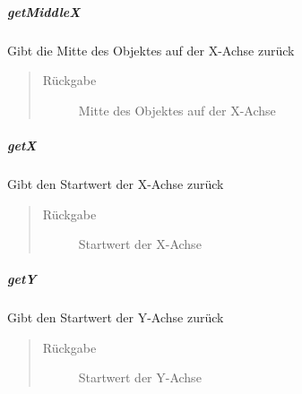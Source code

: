 \documentclass[letterpaper,10pt,ngerman]{sphinxmanual}
\begin{document}
\subparagraph{getMiddleX}
\label{\detokenize{com/linuxluigi/edu/data/ViewPosition:getmiddlex}}

\begin{fulllineitems}
\label{\detokenize{com/linuxluigi/edu/data/ViewPosition:com.linuxluigi.edu.data.ViewPosition.getMiddleX()}}
Gibt die Mitte des Objektes auf der X-Achse zurück
\begin{quote}\begin{description}
\item[{Rückgabe}] \leavevmode
Mitte des Objektes auf der X-Achse

\end{description}\end{quote}

\end{fulllineitems}



\subparagraph{getX}
\label{\detokenize{com/linuxluigi/edu/data/ViewPosition:getx}}

\begin{fulllineitems}
\label{\detokenize{com/linuxluigi/edu/data/ViewPosition:com.linuxluigi.edu.data.ViewPosition.getX()}}
Gibt den Startwert der X-Achse zurück
\begin{quote}\begin{description}
\item[{Rückgabe}] \leavevmode
Startwert der X-Achse

\end{description}\end{quote}

\end{fulllineitems}



\subparagraph{getY}
\label{\detokenize{com/linuxluigi/edu/data/ViewPosition:gety}}

\begin{fulllineitems}
\label{\detokenize{com/linuxluigi/edu/data/ViewPosition:com.linuxluigi.edu.data.ViewPosition.getY()}}
Gibt den Startwert der Y-Achse zurück
\begin{quote}\begin{description}
\item[{Rückgabe}] \leavevmode
Startwert der Y-Achse

\end{description}\end{quote}

\end{fulllineitems}
\end{document}
